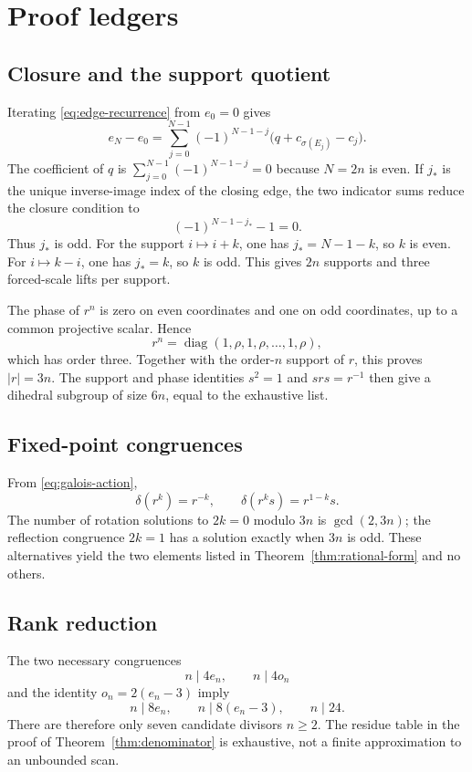 \section{Proof ledgers}
\label{app:proof-ledgers}

\subsection{Closure and the support quotient}

Iterating \eqref{eq:edge-recurrence} from \(e_0=0\) gives
\[
e_N-e_0=
\sum_{j=0}^{N-1}(-1)^{N-1-j}
\bigl(q+c_{\sigma(E_j)}-c_j\bigr).
\]
The coefficient of \(q\) is
\(\sum_{j=0}^{N-1}(-1)^{N-1-j}=0\) because \(N=2n\) is even.
If \(j_*\) is the unique inverse-image index of the closing edge, the two
indicator sums reduce the closure condition to
\[
(-1)^{N-1-j_*}-1=0.
\]
Thus \(j_*\) is odd.  For the support \(i\mapsto i+k\), one has
\(j_*=N-1-k\), so \(k\) is even.  For \(i\mapsto k-i\), one has
\(j_*=k\), so \(k\) is odd.  This gives \(2n\) supports and three
forced-scale lifts per support.

The phase of \(r^n\) is zero on even coordinates and one on odd
coordinates, up to a common projective scalar.  Hence
\[
r^n=\operatorname{diag}(1,\rho,1,\rho,\ldots,1,\rho),
\]
which has order three.  Together with the order-\(n\) support of \(r\),
this proves \(|r|=3n\).  The support and phase identities
\(s^2=1\) and \(srs=r^{-1}\) then give a dihedral subgroup of size
\(6n\), equal to the exhaustive list.

\subsection{Fixed-point congruences}

From \eqref{eq:galois-action},
\[
\delta(r^k)=r^{-k},\qquad
\delta(r^ks)=r^{1-k}s.
\]
The number of rotation solutions to \(2k=0\) modulo \(3n\) is
\(\gcd(2,3n)\); the reflection congruence \(2k=1\) has a solution exactly
when \(3n\) is odd.  These alternatives yield the two elements listed in
Theorem~\ref{thm:rational-form} and no others.

\subsection{Rank reduction}

The two necessary congruences
\[
n\mid4e_n,\qquad n\mid4o_n
\]
and the identity \(o_n=2(e_n-3)\) imply
\[
n\mid8e_n,\qquad n\mid8(e_n-3),\qquad n\mid24.
\]
There are therefore only seven candidate divisors \(n\ge2\).  The residue
table in the proof of Theorem~\ref{thm:denominator} is exhaustive, not a
finite approximation to an unbounded scan.

